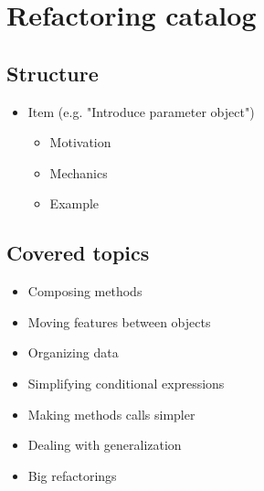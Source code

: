 %
%

\section{Refactoring catalog}

\subsection{Structure}
\begin{FrameWithSubSection}
    \begin{itemize}
        \item Item (e.g. "Introduce parameter object")
            \begin{itemize}
                \item Motivation
                \item Mechanics
                \item Example
            \end{itemize}
    \end{itemize}
\end{FrameWithSubSection}

\subsection{Covered topics}
\begin{FrameWithSubSection}
    \begin{itemize}
        \item Composing methods
        \item Moving features between objects
        \item Organizing data
        \item Simplifying conditional expressions
        \item Making methods calls simpler
        \item Dealing with generalization
        \item Big refactorings
    \end{itemize}
\end{FrameWithSubSection}

